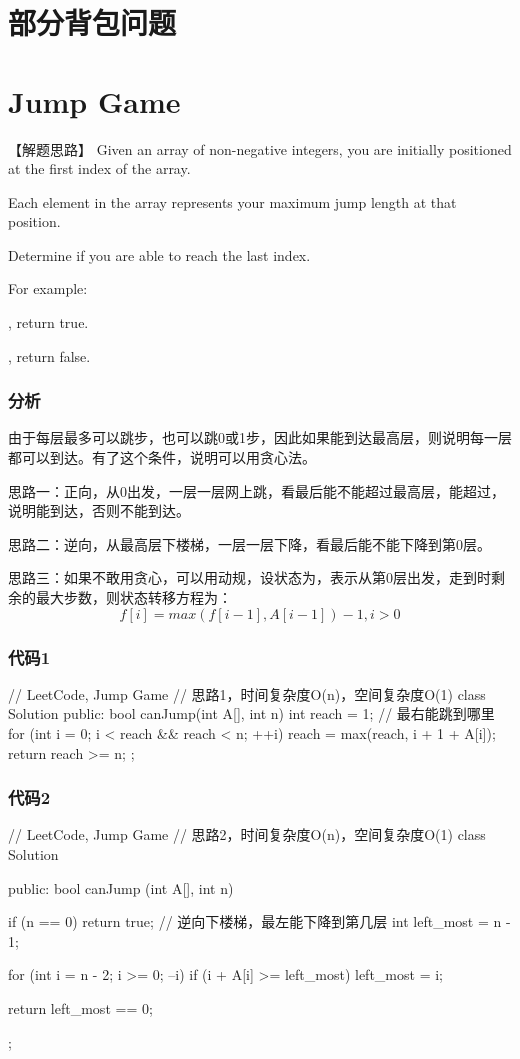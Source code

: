 \section{部分背包问题} %


\section{Jump Game} %
\label{sec:jump-game}


【解题思路】
Given an array of non-negative integers, you are initially positioned at the first index of the array.

Each element in the array represents your maximum jump length at that position.

Determine if you are able to reach the last index.

For example:

, return true.

, return false.


\subsubsection{分析}
由于每层最多可以跳步，也可以跳0或1步，因此如果能到达最高层，则说明每一层都可以到达。有了这个条件，说明可以用贪心法。

思路一：正向，从0出发，一层一层网上跳，看最后能不能超过最高层，能超过，说明能到达，否则不能到达。

思路二：逆向，从最高层下楼梯，一层一层下降，看最后能不能下降到第0层。

思路三：如果不敢用贪心，可以用动规，设状态为，表示从第0层出发，走到时剩余的最大步数，则状态转移方程为：
$$
f[i] = max(f[i-1], A[i-1])-1, i > 0
$$


\subsubsection{代码1}
\begin{Code}
	// LeetCode, Jump Game
	// 思路1，时间复杂度O(n)，空间复杂度O(1)
	class Solution {
		public:
		bool canJump(int A[], int n) {
			int reach = 1; // 最右能跳到哪里
			for (int i = 0; i < reach && reach < n; ++i)
			reach = max(reach,  i + 1 + A[i]);
			return reach >= n;
		}
	};
\end{Code}


\subsubsection{代码2}
\begin{Code}
	// LeetCode, Jump Game
	// 思路2，时间复杂度O(n)，空间复杂度O(1)
	class Solution {
		public:
		bool canJump (int A[], int n) {
			if (n == 0) return true;
			// 逆向下楼梯，最左能下降到第几层
			int left_most = n - 1;
			
			for (int i = n - 2; i >= 0; --i)
			if (i + A[i] >= left_most)
			left_most = i;
			
			return left_most == 0;
		}
	};
\end{Code}


